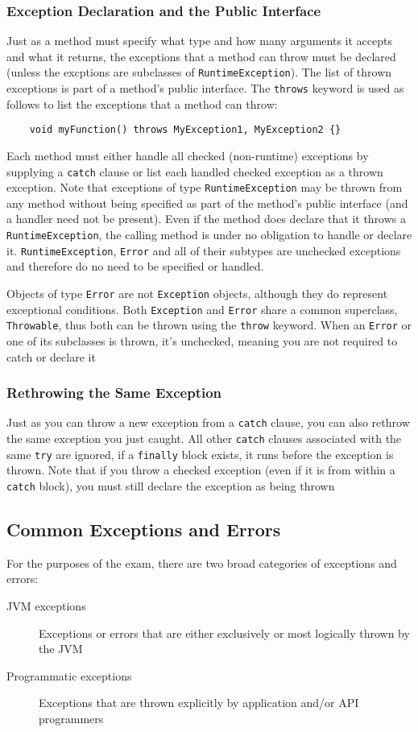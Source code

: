\subsubsection{Exception Declaration and the Public Interface}
Just as a method must specify what type and how many arguments it accepts and 
what it returns, the exceptions that a method can throw must be declared 
(unless the excptions are subclasses of \verb#RuntimeException#). The list of 
thrown exceptions is part of a method's public interface. The \verb#throws# 
keyword is used as follows to list the exceptions that a method can throw:
\begin{verbatim}
    void myFunction() throws MyException1, MyException2 {}
\end{verbatim}
Each method must either handle all checked (non-runtime) exceptions by 
supplying a \verb#catch# clause or list each handled checked exception as a 
thrown exception. Note that exceptions of type \verb#RuntimeException# may be 
thrown from any method without being specified as part of the method's public 
interface (and a handler need not be present). Even if the method does declare 
that it throws a \verb#RuntimeException#, the calling method is under no 
obligation to handle or declare it. \verb#RuntimeException#, \verb#Error# and 
all of their subtypes are unchecked exceptions and therefore do no need to be 
specified or handled.

Objects of type \verb#Error# are not \verb#Exception# objects, although they do 
represent exceptional conditions. Both \verb#Exception# and \verb#Error# share 
a common superclass, \verb#Throwable#, thus both can be thrown using the 
\verb#throw# keyword. When an \verb#Error# or one of its subclasses is thrown, 
it's unchecked, meaning you are not required to catch or declare it

\subsubsection{Rethrowing the Same Exception}
Just as you can throw a new exception from a \verb#catch# clause, you can also 
rethrow the same exception you just caught. All other \verb#catch# clauses 
associated with the same \verb#try# are ignored, if a \verb#finally# block 
exists, it runs before the exception is thrown. Note that if you throw a 
checked exception (even if it is from within a \verb#catch# block), you must 
still declare the exception as being thrown

\subsection{Common Exceptions and Errors}
For the purposes of the exam, there are two broad categories of exceptions and 
errors:
\begin{description}
    \item[JVM exceptions] Exceptions or errors that are either exclusively or 
    most logically thrown by the JVM
    \item[Programmatic exceptions] Exceptions that are thrown explicitly by 
    application and/or API programmers
\end{description}

